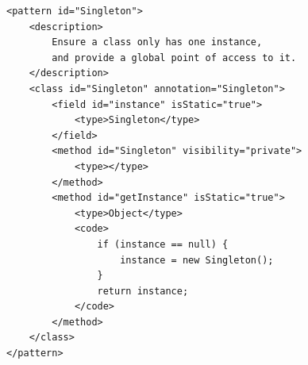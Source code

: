 \newpage
\begin{lstlisting}[label=code:xml, caption=Περιγραφή μοτίβου Singleton.]
<pattern id="Singleton">
    <description>
        Ensure a class only has one instance, 
        and provide a global point of access to it.
    </description>
    <class id="Singleton" annotation="Singleton">
        <field id="instance" isStatic="true">
            <type>Singleton</type>
        </field>
        <method id="Singleton" visibility="private">
            <type></type>
        </method>
        <method id="getInstance" isStatic="true">
            <type>Object</type>
            <code>
                if (instance == null) {
                    instance = new Singleton();
                }
                return instance;
            </code>
        </method>
    </class>
</pattern>
\end{lstlisting}
